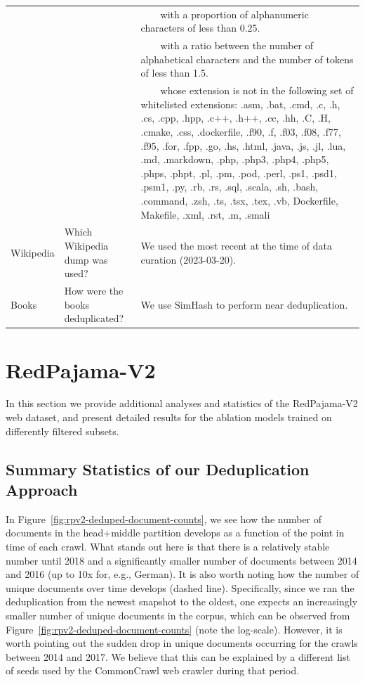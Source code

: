 \documentclass{article}
\newcommand{\tabitem}{~~\llap{\textbullet}~~}
\begin{document}
\begin{table}[h]
{\begin{tabular}{p{} p{} p{}}
    &&\tabitem with a proportion of alphanumeric characters of less than 0.25.\\
    &&\tabitem with a ratio between the number of alphabetical characters and the number of tokens of less than 1.5.\\
    &&\tabitem whose extension is not in the following set of whitelisted extensions: 
    .asm, .bat, .cmd, .c, .h, .cs, .cpp, .hpp, .c++, .h++, .cc, .hh, .C, .H, .cmake, .css,
    .dockerfile, .f90, .f, .f03, .f08, .f77, .f95, .for, .fpp, .go, .hs, .html, .java, .js,
    .jl, .lua, .md, .markdown, .php, .php3, .php4, .php5, .phps, .phpt, .pl, .pm, .pod, .perl,
    .ps1, .psd1, .psm1, .py, .rb, .rs, .sql, .scala, .sh, .bash, .command, .zsh, .ts, .tsx,
    .tex, .vb, Dockerfile, Makefile, .xml, .rst, .m, .smali
\\
\cmidrule(lr){1-3}
\multirow{1}{*}{{Wikipedia}} & Which Wikipedia dump was used?                                     & We used the most recent at the time of data curation (2023-03-20).                                   \\
\cmidrule(lr){1-3}
\multirow{1}{*}{{Books}} & How were the books deduplicated?                                   & We use SimHash to perform near deduplication.                                                       \\
\bottomrule
\end{tabular}
}
\end{table}


\section{RedPajama-V2}
In this section we provide additional analyses and statistics of the RedPajama-V2 web dataset, and present detailed results for the ablation models trained on differently filtered subsets.

\subsection{Summary Statistics of our Deduplication Approach}
In Figure~\ref{fig:rpv2-deduped-document-counts}, we see how the number of documents in the head+middle partition develops as a function of the point in time of each crawl. What stands out here is that there is a relatively stable number until 2018 and a significantly smaller number of documents between 2014 and 2016 (up to 10x for, e.g., German). It is also worth noting how the number of unique documents over time develops (dashed line). Specifically, since we ran the deduplication from the newest snapshot to the oldest, one expects an increasingly smaller number of unique documents in the corpus, which can be observed from Figure~\ref{fig:rpv2-deduped-document-counts} (note the log-scale). However, it is worth pointing out the sudden drop in unique documents occurring for the crawls between 2014 and 2017. We believe that this can be explained by a different list of seeds used by the CommonCrawl web crawler during that period.
\end{document}

